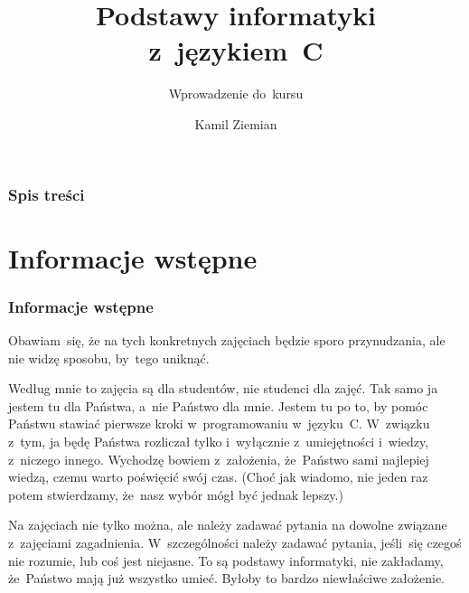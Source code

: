 \documentclass[10pt,t]{beamer}
\title{Podstawy informatyki z~językiem~C}
\subtitle{Wprowadzenie do~kursu}
\author{Kamil Ziemian \\
  \email}
\begin{document}





\RaggedRight





\maketitle





\begin{frame}
  \frametitle{Spis treści}


  \tableofcontents

\end{frame}





\section{Informacje wstępne}



\begin{frame}
  \frametitle{Informacje wstępne}


  Obawiam~się, że na tych konkretnych zajęciach będzie sporo przynudzania,
  ale nie widzę sposobu, by~tego uniknąć.

  Według mnie to zajęcia są dla studentów, nie studenci dla zajęć. Tak samo
  ja jestem tu dla Państwa, a~nie Państwo dla mnie. Jestem tu po to, by
  pomóc Państwu stawiać pierwsze kroki w~programowaniu w~języku~C.
  W~związku z~tym, ja będę Państwa rozliczał tylko i~wyłącznie
  z~umiejętności i~wiedzy, z~niczego innego. Wychodzę bowiem z~założenia,
  że~Państwo sami najlepiej wiedzą, czemu warto poświęcić swój czas. (Choć
  jak wiadomo, nie jeden raz potem stwierdzamy, że~nasz wybór mógł być
  jednak lepszy.)

  Na zajęciach nie tylko można, ale \alert{należy} zadawać pytania
  na dowolne związane z~zajęciami zagadnienia. W~szczególności
  \alert{należy} zadawać pytania, jeśli~się czegoś nie rozumie, lub coś
  jest niejasne. To są podstawy informatyki, \alert{nie} zakładamy,
  że~Państwo mają już wszystko umieć. Byłoby to bardzo niewłaściwe
  założenie.

\end{frame}
\end{document}
